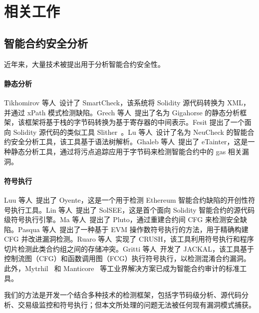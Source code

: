 \section{相关工作}
\subsection{智能合约安全分析}
近年来，大量技术被提出用于分析智能合约安全性。

\paragraph{静态分析}
Tikhomirov 等人~\cite{tikhomirov2018smartcheck}设计了 SmartCheck，该系统将 Solidity 源代码转换为 XML，并通过 xPath 模式检测缺陷。Grech 等人~\cite{grech2022elipmoc}提出了名为 Gigahorse 的静态分析框架，该框架将基于栈的字节码转换为基于寄存器的中间表示。Fesit 提出了一个面向 Solidity 源代码的类似工具 Slither~\cite{Slither}。Lu 等人~\cite{lu2021neucheck}设计了名为 NeuCheck 的智能合约安全分析工具，该工具基于语法树解析。Ghaleb 等人~\cite{ghaleb2022etainter}提出了 eTainter，这是一种静态分析工具，通过将污点追踪应用于字节码来检测智能合约中的 gas 相关漏洞。

\paragraph{符号执行}
Luu 等人~\cite{luu2016making}提出了 Oyente，这是一个用于检测 Ethereum 智能合约缺陷的开创性符号执行工具。Lin 等人~\cite{lin2022solsee}提出了 SolSEE，这是首个面向 Solidity 智能合约的源代码级符号执行引擎。Ma 等人~\cite{ma2021pluto}提出了 Pluto，通过重建合约间 CFG 来检测安全缺陷。Pasqua 等人~\cite{pasqua2023enhancing}提出了一种基于 EVM 操作数符号执行的方法，用于精确构建 CFG 并改进漏洞检测。Ruaro 等人~\cite{ruaro2024not}实现了 CRUSH，该工具利用符号执行和程序切片检测此类合约组之间的存储冲突。Gritti 等人~\cite{gritti2023confusum}开发了 JACKAL，该工具基于控制流图（CFG）和函数调用图（FCG）执行符号执行，以检测混淆合约漏洞。此外，Mytrhil~\cite{mythril} 和 Manticore~\cite{mossberg2019manticore} 等工业界解决方案已成为智能合约审计的标准工具。

我们的方法是开发一个结合多种技术的检测框架，包括字节码级分析、源代码分析、交易级监控和符号执行；但本文所处理的问题无法被任何现有漏洞模式捕获。

